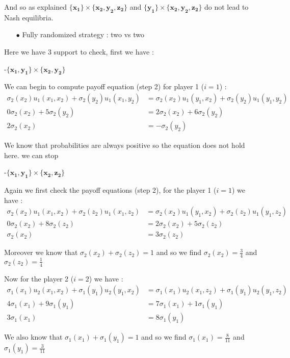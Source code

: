 And so as explained $\mathbf{\{x_1\}}\times\mathbf{\{x_2,y_2,z_2\}}$ and $\mathbf{\{y_1\}}\times\mathbf{\{x_2,y_2,z_2\}}$ do not lead to Nash equilibria.


\begin{itemize}
  \item[$\bullet$] Fully randomized strategy : two vs two
\end{itemize}

Here we have 3 support to check, first we have :

-$\mathbf{\{x_1,y_1\}}\times\mathbf{\{x_2,y_2\}}$

 We can begin to compute payoff equation (step 2) for player 1 ($i=1$) :
 \begin{align*}
 \sigma_2(x_2)u_1(x_1,x_2) + \sigma_2(y_2)u_1(x_1,y_2) &= \sigma_2(x_2)u_1(y_1,x_2) + \sigma_2(y_2)u_1(y_1,y_2) \\
 0\sigma_2(x_2)+5\sigma_2(y_2)&= 2\sigma_2(x_2) + 6\sigma_2(y_2) \\
 2\sigma_2(x_2)&=-\sigma_2(y_2)
\end{align*}

We know that probabilities are always positive so the equation does not hold here. we can stop


-$\mathbf{\{x_1,y_1\}}\times\mathbf{\{x_2,z_2\}}$

Again we first check the payoff equations (step 2), for the player 1 ($i=1$) we have : 
\begin{align*}
 \sigma_2(x_2)u_1(x_1,x_2) + \sigma_2(z_2)u_1(x_1,z_2) &= \sigma_2(x_2)u_1(y_1,x_2) + \sigma_2(z_2)u_1(y_1,z_2) \\
 0\sigma_2(x_2)+8\sigma_2(z_2)&= 2\sigma_2(x_2) + 5\sigma_2(z_2) \\
 \sigma_2(x_2)&=3\sigma_2(z_2)
\end{align*}

Moreover we know that $\sigma_2(x_2) + \sigma_2(z_2) = 1$ and so we find $\sigma_2(x_2)=\frac{3}{4}$ and $\sigma_2(z_2)=\frac{1}{4}$

Now for the player 2 ($i=2$) we have : 
\begin{align*}
 \sigma_1(x_1)u_2(x_1,x_2) + \sigma_1(y_1)u_2(y_1,x_2) &= \sigma_1(x_1)u_2(x_1,z_2) + \sigma_1(y_1)u_2(y_1,z_2) \\
 4\sigma_1(x_1)+9\sigma_1(y_1)&= 7\sigma_1(x_1) + 1\sigma_1(y_1) \\
 3\sigma_1(x_1)&=8\sigma_1(y_1)
\end{align*}

We also know that $\sigma_1(x_1) + \sigma_1(y_1) = 1$ and so we find $\sigma_1(x_1)=\frac{8}{11}$ and $\sigma_1(y_1)=\frac{3}{11}$

